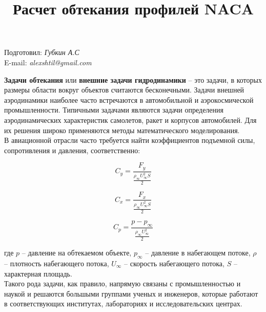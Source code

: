\documentclass[12pt,a4paper]{article}
\author{}
\title{\textbf{Расчет обтекания профилей NACA}}
\date{}
\begin{document}
	\maketitle

	\begin{flushright}

		Подготовил: \textit{Губкин А.С}\\
		E-mail: \textit{alexshtil@gmail.com}\\

	\end{flushright}
    
    \textbf{Задачи обтекания} или \textbf{внешние задачи гидродинамики} -- это задачи, в  которых размеры  области  вокруг  объектов считаются бесконечными. Задачи внешней аэродинамики наиболее часто встречаются в автомобильной и аэрокосмической промышленности. Типичными  задачами  являются  задачи  определения аэродинамических  характеристик  самолетов,  ракет  и  корпусов автомобилей. Для их решения широко применяются методы математического моделирования.\\

    В авиационной отрасли часто требуется найти коэффициентов подъемной силы, сопротивления и давления, соответственно:

    \begin{equation}
        C_{y} = \frac{F_{y}}{\frac{\rho_{\infty} U^{2}_{\infty} S}{2}}
        \label{eqn:Cy_coefficient}
    \end{equation}

    \begin{equation}
        C_{x} = \frac{F_{x}}{\frac{\rho_{\infty} U^{2}_{\infty} S}{2}}
        \label{eqn:Cx_coefficient}
    \end{equation}

    \begin{equation}
        C_{p} = \frac{p - p_{\infty}}{\frac{\rho_{\infty} U^{2}_{\infty}}{2}}
        \label{eqn:Cp_coefficient}
    \end{equation}

    где $p$ -- давление на обтекаемом объекте, $p_{\infty}$ -- давление в набегающем потоке, $\rho$ -- плотность набегающего потока, $U_{\infty}$ -- скорость набегающего потока, $S$ -- характерная площадь.\\

    Такого рода задачи, как правило, напрямую связаны с промышленностью и наукой и решаются большыми группами ученых и инженеров, которые работают в соответствующих институтах, лабораториях и исследовательских центрах.\\
\end{document}
